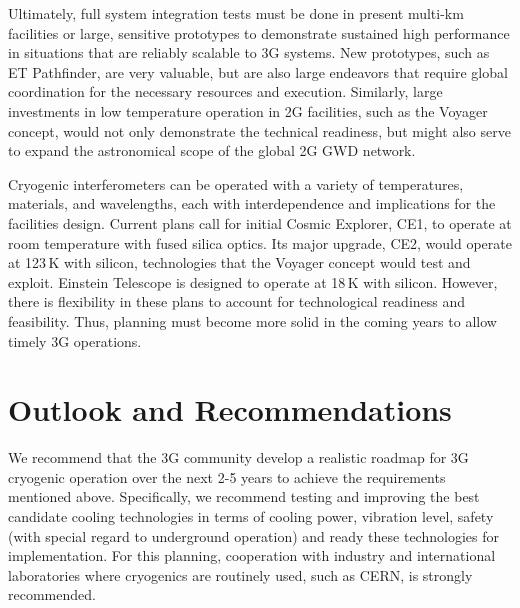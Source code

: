 Ultimately, full system integration tests must be done in present multi-km facilities or large, sensitive prototypes to demonstrate sustained high performance in situations that are reliably scalable to 3G systems. New prototypes, such as ET Pathfinder, are very valuable, but are also large endeavors that require global coordination for the necessary resources and execution. Similarly, large investments in low temperature operation in 2G facilities, such as the Voyager concept, would not only demonstrate the technical readiness, but might also serve to expand the astronomical scope of the global 2G GWD network. 



Cryogenic interferometers can be operated with a variety of temperatures, materials, and wavelengths, each with interdependence and implications for the facilities design. Current plans call for initial Cosmic Explorer, CE1, to operate at room temperature with fused silica optics. Its major upgrade, CE2, would operate at 123\,K with silicon, technologies that the Voyager concept would test and exploit. Einstein Telescope is designed to operate at 18\,K with silicon. However, there is flexibility in these plans to account for technological readiness and feasibility. Thus, planning must become more solid in the coming years to allow timely 3G operations. 

\section{Outlook and Recommendations}
We recommend that the 3G community develop a realistic roadmap for 3G cryogenic operation over the next 2-5 years to achieve the requirements mentioned above. Specifically, we recommend testing and improving the best candidate cooling technologies in terms of cooling power, vibration level, safety (with special regard to underground operation) and ready these technologies for implementation. For this planning, cooperation with industry and international laboratories where cryogenics are routinely used, such as CERN, is strongly recommended.


